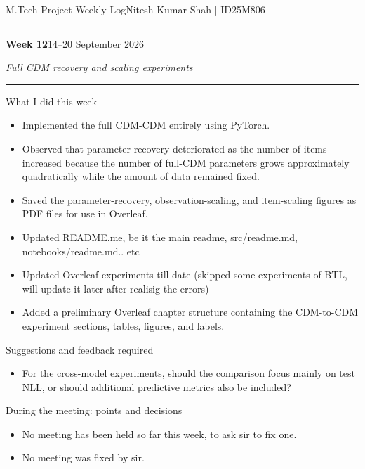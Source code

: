 \documentclass[10pt]{article}
\newcommand{\weekheading}[3]{%
  {\small M.Tech Project Weekly Log}\hfill{\small Nitesh Kumar Shah \;|\; ID25M806}\par
  \vspace{2pt}\hrule\vspace{7pt}
  {\Large\bfseries Week #1}\hfill{\normalsize #2}\par
  \vspace{2pt}
  {\itshape #3}\par
  \vspace{5pt}\hrule\vspace{7pt}
}
\begin{document}
\newpage

\weekheading{12}{14--20 September 2026}
{Full CDM recovery and scaling experiments}

\begin{weeklybox}{What I did this week}

  \small

  \begin{itemize}
    
    \item
     Implemented the full CDM-CDM entirely using
    PyTorch.

    \item Observed that parameter recovery deteriorated as the number
    of items increased because the number of full-CDM parameters grows
    approximately quadratically while the amount of data remained fixed.

    \item Saved the parameter-recovery, observation-scaling, and
    item-scaling figures as PDF files for use in Overleaf.
    \item Updated README.me, be it the main readme, src/readme.md, notebooks/readme.md.. etc
    \item Updated Overleaf experiments till date (skipped some experiments of BTL, will update it later after realisig the errors) 
    \item Added a preliminary Overleaf chapter structure containing
    the CDM-to-CDM experiment sections, tables, figures, and labels.

  \end{itemize}

\end{weeklybox}

\begin{weeklybox}{Suggestions and feedback required}

  \small

  \begin{itemize}


    \item For the cross-model experiments, should the comparison focus
    mainly on test NLL, or should additional predictive metrics also
    be included?

  \end{itemize}

\end{weeklybox}

\begin{weeklybox}{During the meeting: points and decisions}

  \small

  \begin{itemize}

    \item No meeting has been held so far this week, to ask sir to fix one.
    \item No meeting was fixed by sir.
  \end{itemize}

\end{weeklybox}
\end{document}
